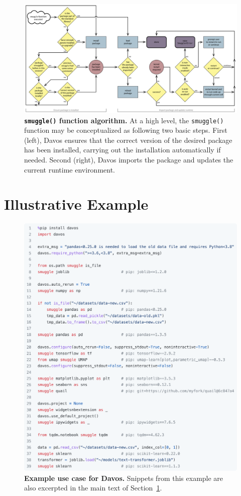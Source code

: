 \documentclass[preprint,12pt,a4paper]{elsarticle}
\begin{document}
\begin{figure}[tp]
\centering
\includegraphics[width=\textwidth]{figs/flow_chart}
\caption{\small \textbf{\texttt{smuggle()} function algorithm.}  At a
  high level, the \texttt{smuggle()} function may be conceptualized as
following two basic steps.  First (left), Davos ensures that the
correct version of the desired package has been installed, carrying
out the installation automatically if needed.  Second (right),
Davos imports the package and updates the current runtime environment.}
\label{fig:flow-chart}
\end{figure}

\section{Illustrative Example}\label{sec:illustrative-example}

\begin{figure}[tp]
\centering
\includegraphics[width=\textwidth]{figs/illustrative_example}
\caption{\small \textbf{Example use case for Davos.}
  Snippets from this example are also excerpted in the main text of
  Section~\ref{sec:illustrative-example}.}
\label{fig:illustrative-example}
\end{figure}
\end{document}
